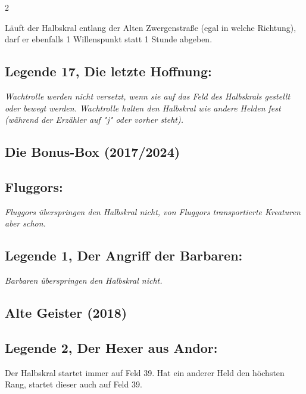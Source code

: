 \documentclass[10pt, a4paper, oneside]{book}
\newcommand{\fan}[1]{\textit{#1}}
\begin{document}
\begin{multicols*}{2}
\begin{bgcolor}
Läuft der Halbskral entlang der Alten Zwergenstraße (egal in welche Richtung), darf er ebenfalls 1 Willenspunkt statt 1 Stunde abgeben.



\subsection{Legende 17, Die letzte Hoffnung:}

\fan{Wachtrolle werden nicht versetzt, wenn sie auf das Feld des Halbskrals gestellt oder bewegt werden. Wachtrolle halten den Halbskral wie andere Helden fest (während der Erzähler auf "j" oder vorher steht).} 

\end{bgcolor}




\begin{bgcolor}[color-bb]
\section{Die Bonus-Box (2017/2024)}



\subsection{Fluggors:}


\fan{Fluggors überspringen den Halbskral nicht, von Fluggors transportierte Kreaturen aber schon.}


\subsection{Legende 1, Der Angriff der Barbaren:}

\fan{Barbaren überspringen den Halbskral nicht.}

\end{bgcolor}




\begin{bgcolor}[color-ag]
\section{Alte Geister (2018)}

\subsection{Legende 2, Der Hexer aus Andor:}

Der Halbskral startet immer auf Feld 39. Hat ein anderer Held den höchsten Rang, startet dieser auch auf Feld 39.


\end{bgcolor}
\end{multicols*}
\end{document}
